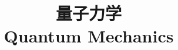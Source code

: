 \documentclass{../thunote}
\begin{document}
\title{量子力学\\Quantum Mechanics}
\maketitle

\frontmatter
\tableofcontents

\mainmatter










\end{document}

